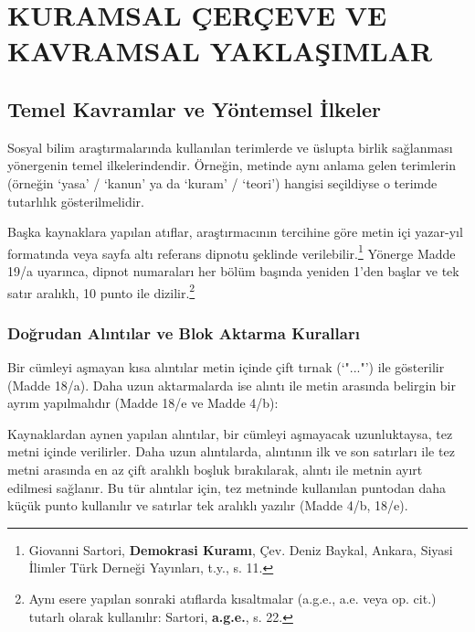 \chapter{KURAMSAL ÇERÇEVE VE KAVRAMSAL YAKLAŞIMLAR}

\section{Temel Kavramlar ve Yöntemsel İlkeler}

Sosyal bilim araştırmalarında kullanılan terimlerde ve üslupta birlik sağlanması yönergenin temel ilkelerindendir. Örneğin, metinde aynı anlama gelen terimlerin (örneğin ‘yasa’ / ‘kanun’ ya da ‘kuram’ / ‘teori’) hangisi seçildiyse o terimde tutarlılık gösterilmelidir.

Başka kaynaklara yapılan atıflar, araştırmacının tercihine göre metin içi yazar-yıl formatında \parencite[11]{sartori_demokrasi} veya sayfa altı referans dipnotu şeklinde verilebilir.\footnote{Giovanni Sartori, \textbf{Demokrasi Kuramı}, Çev. Deniz Baykal, Ankara, Siyasi İlimler Türk Derneği Yayınları, t.y., s. 11.} Yönerge Madde 19/a uyarınca, dipnot numaraları her bölüm başında yeniden 1'den başlar ve tek satır aralıklı, 10 punto ile dizilir.\footnote{Aynı esere yapılan sonraki atıflarda kısaltmalar (a.g.e., a.e. veya op. cit.) tutarlı olarak kullanılır: Sartori, \textbf{a.g.e.}, s. 22.}

\subsection{Doğrudan Alıntılar ve Blok Aktarma Kuralları}

Bir cümleyi aşmayan kısa alıntılar metin içinde çift tırnak (`"..."') ile gösterilir (Madde 18/a). Daha uzun aktarmalarda ise alıntı ile metin arasında belirgin bir ayrım yapılmalıdır (Madde 18/e ve Madde 4/b):

\begin{uzunalinti}
Kaynaklardan aynen yapılan alıntılar, bir cümleyi aşmayacak uzunluktaysa, tez metni içinde verilirler. Daha uzun alıntılarda, alıntının ilk ve son satırları ile tez metni arasında en az çift aralıklı boşluk bırakılarak, alıntı ile metnin ayırt edilmesi sağlanır. Bu tür alıntılar için, tez metninde kullanılan puntodan daha küçük punto kullanılır ve satırlar tek aralıklı yazılır (Madde 4/b, 18/e).
\end{uzunalinti}

